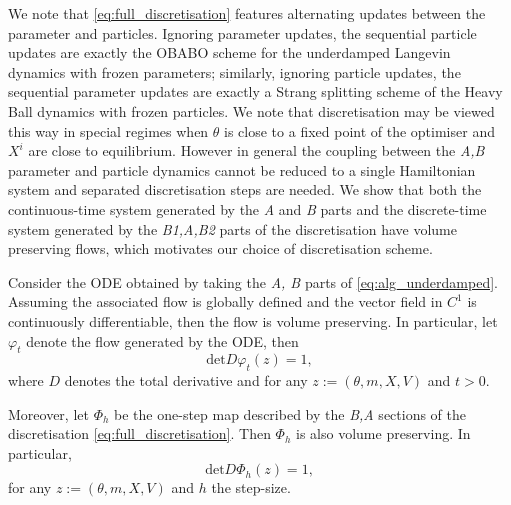 We note that \eqref{eq:full_discretisation} features alternating updates between the parameter and particles. Ignoring parameter updates, the sequential particle updates are exactly the OBABO scheme for the underdamped Langevin dynamics with frozen parameters; similarly, ignoring particle updates, the sequential parameter updates are exactly a Strang splitting scheme of the Heavy Ball dynamics with frozen particles. We note that discretisation may  be viewed this way in special regimes when $\theta$ is close to a fixed point of the optimiser and $X^i$ are close to equilibrium. However in general the coupling between the \textit{A,B} parameter and particle dynamics cannot be reduced to a single Hamiltonian system and separated discretisation steps are needed. We show that both the continuous-time system generated by the \textit{A} and \textit{B} parts and the discrete-time system generated by the \textit{B1,A,B2} parts of the discretisation have volume preserving flows, which motivates our choice of discretisation scheme.

\begin{lemma}\label{lemma:vol_preserve_ode} Consider the ODE obtained by taking the \textit{A, B} parts of \eqref{eq:alg_underdamped}. Assuming the associated flow is globally defined and the vector field in $C^1$ is continuously differentiable, then the flow is volume preserving. In particular, let $\varphi_t$ denote the flow generated by the ODE, then
\begin{equation*}
    \mathrm{det}D\varphi_t(z)=1,
\end{equation*}
where $D$ denotes the total derivative and for any $z:=(\theta,m,X,V)$ and $t>0$. 

Moreover, let $\Phi_h$ be the one-step map described by the \textit{B,A} sections of the discretisation \eqref{eq:full_discretisation}. Then $\Phi_h$ is also volume preserving. In particular,
\begin{equation*}
    \mathrm{det} D\Phi_h(z)=1,
\end{equation*}
for any $z:=(\theta,m,X,V)$ and $h$ the step-size.
\end{lemma}

